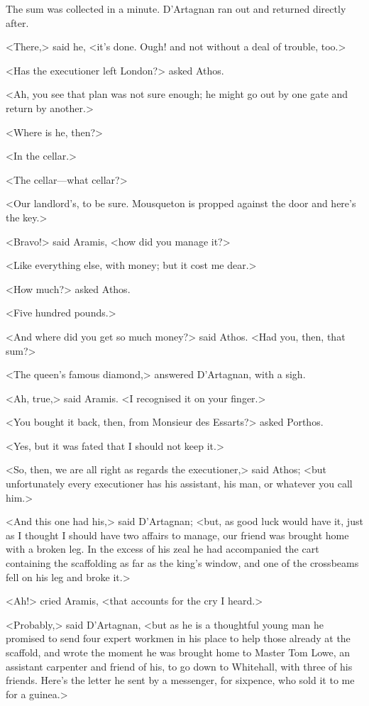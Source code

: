 The sum was collected in a minute. D'Artagnan ran out and returned directly after.

<There,> said he, <it's done. Ough! and not without a deal of trouble, too.>

<Has the executioner left London?> asked Athos.

<Ah, you see that plan was not sure enough; he might go out by one gate and return by another.>

<Where is he, then?>

<In the cellar.>

<The cellar—what cellar?>

<Our landlord's, to be sure. Mousqueton is propped against the door and here's the key.>

<Bravo!> said Aramis, <how did you manage it?>

<Like everything else, with money; but it cost me dear.>

<How much?> asked Athos.

<Five hundred pounds.>

<And where did you get so much money?> said Athos. <Had you, then, that sum?>

<The queen's famous diamond,> answered D'Artagnan, with a sigh.

<Ah, true,> said Aramis. <I recognised it on your finger.>

<You bought it back, then, from Monsieur des Essarts?> asked Porthos.

<Yes, but it was fated that I should not keep it.>

<So, then, we are all right as regards the executioner,> said Athos; <but unfortunately every executioner has his assistant, his man, or whatever you call him.>

<And this one had his,> said D'Artagnan; <but, as good luck would have it, just as I thought I should have two affairs to manage, our friend was brought home with a broken leg. In the excess of his zeal he had accompanied the cart containing the scaffolding as far as the king's window, and one of the crossbeams fell on his leg and broke it.>

<Ah!> cried Aramis, <that accounts for the cry I heard.>

<Probably,> said D'Artagnan, <but as he is a thoughtful young man he promised to send four expert workmen in his place to help those already at the scaffold, and wrote the moment he was brought home to Master Tom Lowe, an assistant carpenter and friend of his, to go down to Whitehall, with three of his friends. Here's the letter he sent by a messenger, for sixpence, who sold it to me for a guinea.>

